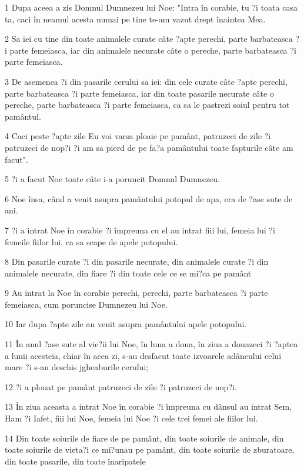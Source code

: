 \par 1 Dupa aceea a zis Domnul Dumnezeu lui Noe: "Intra în corabie, tu ?i toata casa ta, caci în neamul acesta numai pe tine te-am vazut drept înaintea Mea.
\par 2 Sa iei cu tine din toate animalele curate câte ?apte perechi, parte barbateasca ?i parte femeiasca, iar din animalele necurate câte o pereche, parte barbateasca ?i parte femeiasca.
\par 3 De asemenea ?i din pasarile cerului sa iei: din cele curate câte ?apte perechi, parte barbateasca ?i parte femeiasca, iar din toate pasarile necurate câte o pereche, parte barbateasca ?i parte femeiasca, ca sa le pastrezi soiul pentru tot pamântul.
\par 4 Caci peste ?apte zile Eu voi varsa ploaie pe pamânt, patruzeci de zile ?i patruzeci de nop?i ?i am sa pierd de pe fa?a pamântului toate fapturile câte am facut".
\par 5 ?i a facut Noe toate câte i-a poruncit Domnul Dumnezeu.
\par 6 Noe însa, când a venit asupra pamântului potopul de apa, era de ?ase sute de ani.
\par 7 ?i a intrat Noe în corabie ?i împreuna cu el au intrat fiii lui, femeia lui ?i femeile fiilor lui, ca sa scape de apele potopului.
\par 8 Din pasarile curate ?i din pasarile necurate, din animalele curate ?i din animalele necurate, din fiare ?i din toate cele ce se mi?ca pe pamânt
\par 9 Au intrat la Noe în corabie perechi, perechi, parte barbateasca ?i parte femeiasca, cum poruncise Dumnezeu lui Noe.
\par 10 Iar dupa ?apte zile au venit asupra pamântului apele potopului.
\par 11 În anul ?ase sute al vie?ii lui Noe, în luna a doua, în ziua a douazeci ?i ?aptea a lunii acesteia, chiar în acea zi, s-au desfacut toate izvoarele adâncului celui mare ?i s-au deschis jgheaburile cerului;
\par 12 ?i a plouat pe pamânt patruzeci de zile ?i patruzeci de nop?i.
\par 13 În ziua aceasta a intrat Noe în corabie ?i împreuna cu dânsul au intrat Sem, Ham ?i Iafet, fiii lui Noe, femeia lui Noe ?i cele trei femei ale fiilor lui.
\par 14 Din toate soiurile de fiare de pe pamânt, din toate soiurile de animale, din toate soiurile de vieta?i ce mi?unau pe pamânt, din toate soiurile de zburatoare, din toate pasarile, din toate înaripatele
